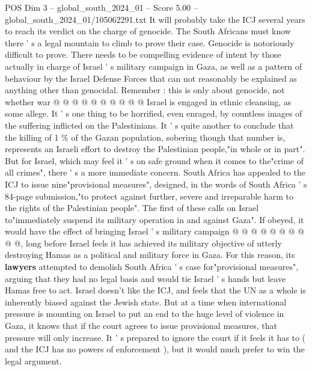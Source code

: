\begin{textsample}{POS Dim 3 – global\_south\_2024\_01 – Score 5.00 – global\_south\_2024\_01/105062291.txt}
It will probably take the ICJ several years to reach its verdict on the charge of genocide.
The South Africans must know there ' s a legal mountain to climb to prove their case.
Genocide is notoriously difficult to prove.
There needs to be compelling evidence of intent by those actually in charge of Israel ' s military campaign in Gaza, as well as a pattern of behaviour by the Israel Defense Forces that can not reasonably be explained as anything other than genocidal.
Remember : this is only about genocide, not whether war @ @ @ @ @ @ @ @ @ @ Israel is engaged in ethnic cleansing, as some allege.
It ' s one thing to be horrified, even enraged, by countless images of the suffering inflicted on the Palestinians.
It ' s quite another to conclude that the killing of 1 \% of the Gazan population, sobering though that number is, represents an Israeli effort to destroy the Palestinian people,"in whole or in part".
But for Israel, which may feel it ' s on safe ground when it comes to the"crime of all crimes", there ' s a more immediate concern.
South Africa has appealed to the ICJ to issue nine"provisional measures", designed, in the words of South Africa ' s 84-page submission,"to protect against further, severe and irreparable harm to the rights of the Palestinian people".
The first of these calls on Israel to"immediately suspend its military operation in and against Gaza".
If obeyed, it would have the effect of bringing Israel ' s military campaign @ @ @ @ @ @ @ @ @ @, long before Israel feels it has achieved its military objective of utterly destroying Hamas as a political and military force in Gaza.
For this reason, its \textbf{lawyers} attempted to demolish South Africa ' s case for"provisional measures", arguing that they had no legal basis and would tie Israel ' s hands but leave Hamas free to act.
Israel doesn't like the ICJ, and feels that the UN as a whole is inherently biased against the Jewish state.
But at a time when international pressure is mounting on Israel to put an end to the huge level of violence in Gaza, it knows that if the court agrees to issue provisional measures, that pressure will only increase.
It ' s prepared to ignore the court if it feels it has to ( and the ICJ has no powers of enforcement ), but it would much prefer to win the legal argument.

\end{textsample}
